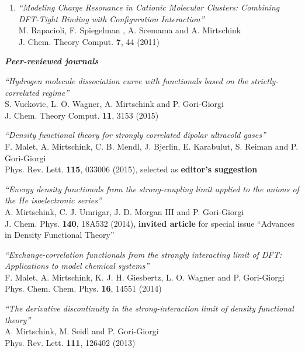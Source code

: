 \documentclass[line,margin]{res}
\begin{document}
\begin{resume}
\begin{enumerate}
				\item {\sl ``Modeling Charge Resonance in Cationic Molecular Clusters: Combining DFT-Tight Binding with Configuration Interaction''}\\
					M. Rapacioli, F. Spiegelman , A. Scemama and A. Mirtschink\\
					J. Chem. Theory Comput. \textbf{7}, 44 (2011)

			\end{enumerate}								

				\textit{\textbf{Peer-reviewed journals}}\smallskip

				\begin{etaremune}

				\item {\sl ``Hydrogen molecule dissociation curve with functionals based on the strictly-correlated regime''}\\
				S. Vuckovic, L. O. Wagner, A. Mirtschink and P. Gori-Giorgi\\
				J. Chem. Theory Comput. \textbf{11}, 3153 (2015)
				
				\item {\sl ``Density functional theory for strongly correlated dipolar ultracold gases''}\\
				F. Malet, A. Mirtschink, C. B. Mendl, J. Bjerlin, E. Karabulut, S. Reiman and P. Gori-Giorgi\\
				Phys. Rev. Lett. \textbf{115}, 033006 (2015), selected as \textbf{editor's suggestion}
				
				\item {\sl ``Energy density functionals from the strong-coupling limit applied to the anions of the He isoelectronic series''}\\
				A. Mirtschink, C. J. Umrigar, J. D. Morgan III and P. Gori-Giorgi\\
				J. Chem. Phys. \textbf{140}, 18A532 (2014), \textbf{invited article} for special issue ``Advances in Density Functional Theory''

				\item {\sl ``Exchange-correlation functionals from the strongly interacting limit of DFT: Applications to model chemical systems''}\\
				F. Malet, A. Mirtschink, K. J. H. Giesbertz, L. O. Wagner and P. Gori-Giorgi\\
				Phys. Chem. Chem. Phys. \textbf{16}, 14551 (2014)

				\item {\sl ``The derivative discontinuity in the strong-interaction limit of density functional theory''}\\
				A. Mirtschink, M. Seidl and P. Gori-Giorgi\\
				Phys. Rev. Lett. \textbf{111}, 126402 (2013)        


\end{etaremune}
\end{resume}
\end{document}
